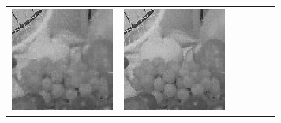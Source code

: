 \documentclass[11pt,a4paper,openright,oneside]{book}
\numberwithin{equation}{section}
\begin{document}
{\begin{figure}[h]
\begin{adjustwidth}{-3cm}{-3cm}
\begin{tabular}{>{\centering\arraybackslash}m{1.5cm} m{2.5cm} m{2.5cm} m{2.5cm} m{2.5cm} m{2.5cm}}
        \includegraphics[width=\linewidth]{media/tnale/AAAfruits-comp3-ale-8.png} & 
        \includegraphics[width=\linewidth]{media/tnale/AAAfruits-comp4-ale-8.png} &

\end{tabular}
\end{adjustwidth}
\end{figure}}
\end{document}
